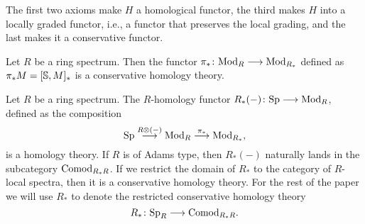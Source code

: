 \begin{remark}
    The first two axioms make $H$ a homological functor, the third makes $H$ into a locally graded functor, i.e., a functor that preserves the local grading, and the last makes it a conservative functor. 
\end{remark}

\begin{example}
    Let $R$ be a ring spectrum. Then the functor $\pi_*\colon \Mod_R\longrightarrow \Mod_{R_*}$ defined as $\pi_* M = [\S, M]_*$ is a conservative homology theory. 
\end{example}

\begin{example}
    Let $R$ be a ring spectrum. The $R$-homology functor $R_*(-)\colon \Sp \longrightarrow \Mod_R$, defined as the composition 
    $$\Sp\overset{R\otimes (-)}\longrightarrow \Mod_R \overset{\pi_*}\longrightarrow \Mod_{R_*},$$
    is a homology theory. If $R$ is of Adams type, then $R_*(-)$ naturally lands in the subcategory $\Comod_{R_*R}$. If we restrict the domain of $R_*$ to the category of $R$-local spectra, then it is a conservative homology theory. For the rest of the paper we will use $R_*$ to denote the restricted conservative homology theory 
    \[R_*\colon \Sp_R\to \Comod_{R_*R}.\]
\end{example}


